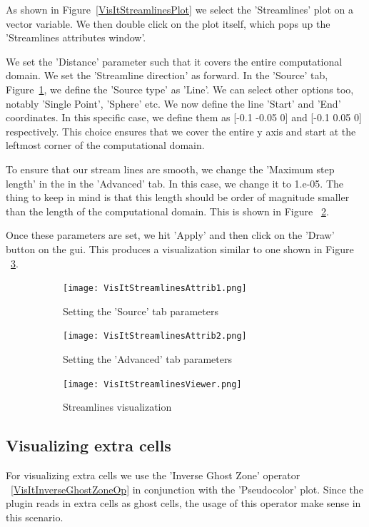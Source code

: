 As shown in Figure~\ref{VisItStreamlinesPlot} we select the
'Streamlines' plot on a vector variable. We then double click on the
plot itself, which pops up the 'Streamlines attributes window'.

We set the 'Distance' parameter such that it covers the entire
computational domain. We set the 'Streamline direction' as forward. In
the 'Source' tab, Figure~\ref{VisItStreamlinesAttrib1}, we define the
'Source type' as 'Line'. We can select other options too, notably
'Single Point', 'Sphere' etc. We now define the line 'Start' and 'End'
coordinates. In this specific case, we define them as [-0.1 -0.05 0]
and [-0.1 0.05 0] respectively. This choice ensures that we cover the
entire y axis and start at the leftmost corner of the computational
domain.

To ensure that our stream lines are smooth, we change the 'Maximum
step length' in the in the 'Advanced' tab. In this case, we change it
to 1.e-05. The thing to keep in mind is that this length should be
order of magnitude smaller than the length of the computational
domain. This is shown in Figure ~\ref{VisItStreamlinesAttrib2}.


Once these parameters are set, we hit 'Apply' and then click on the 'Draw' button on the gui. This produces a visualization similar to one shown in Figure ~\ref{VisItStreamlinesViewer}.
\begin{figure}[htb]
  \centering
  \begin{subfigure}[b]{0.3\textwidth}
  \centering
    \texttt{[image: VisItStreamlinesAttrib1.png]}
    \caption{Setting the 'Source' tab parameters}
    \label{VisItStreamlinesAttrib1}
  \end{subfigure}
  \begin{subfigure}[b]{0.3\textwidth}
  \centering
    \texttt{[image: VisItStreamlinesAttrib2.png]}
    \caption{Setting the 'Advanced' tab parameters}
    \label{VisItStreamlinesAttrib2}
  \end{subfigure}
  \begin{subfigure}[b]{0.3\textwidth}
  \centering
    \texttt{[image: VisItStreamlinesViewer.png]}
    \caption{Streamlines visualization}
    \label{VisItStreamlinesViewer}
  \end{subfigure}
  \caption{}
  \label{ucf.fig10}
\end{figure}


\subsection{Visualizing extra cells}
For visualizing extra cells we use the 'Inverse Ghost Zone' operator
~\ref{VisItInverseGhostZoneOp} in conjunction with the 'Pseudocolor'
plot. Since the plugin reads in extra cells as ghost cells, the usage
of this operator make sense in this scenario.

